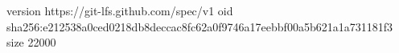 version https://git-lfs.github.com/spec/v1
oid sha256:e212538a0ced0218db8deccac8fc62a0f9746a17eebbf00a5b621a1a731181f3
size 22000
